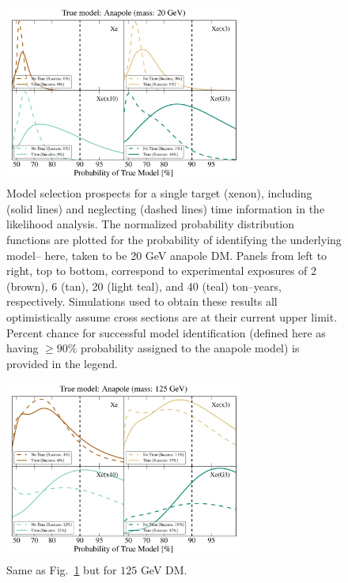 \documentclass[11pt]{article}
\begin{document}
\begin{figure}
\centering
\includegraphics[width=0.7\textwidth]{plots/PDF_20GeV_Anapole_50sims_Xe_Xe3x_Xe10x_XeG3_GF_TNT.pdf}
\caption{\label{fig:20gev_anapole_XeFull_TNT_GF}
Model selection prospects for a single target (xenon), including (solid lines) and neglecting (dashed lines) time information in the likelihood analysis. The normalized probability distribution functions are plotted for the probability of identifying the underlying model-- here, taken to be 20 GeV anapole DM. Panels from left to right, top to bottom, correspond to experimental exposures of 2 (brown), 6 (tan), 20 (light teal), and 40 (teal) ton--years, respectively. Simulations used to obtain these results all optimistically assume cross sections are at their current upper limit. Percent chance for successful model identification (defined here as having $\geq 90 \%$ probability assigned to the anapole model) is provided in the legend.}
\end{figure}
\begin{figure}
\centering
\includegraphics[width=0.7\textwidth]{plots/PDF_125GeV_Anapole_50sims_Xe_Xe3x_Xe10x_XeG3_GF_TNT.pdf}
\caption{\label{fig:125gev_anapole_XeFull_TNT_GF}
Same as Fig.~\ref{fig:20gev_anapole_XeFull_TNT_GF} but for $125$ GeV DM.}
\end{figure}
\end{document}
